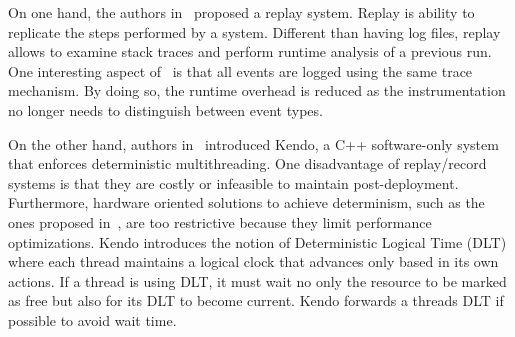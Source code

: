 On one hand, the authors
in~\cite{replayDeterminism} proposed a replay system.
Replay is ability to replicate the steps performed by a system.
Different than having log files, replay allows to examine
stack traces and perform runtime analysis of a previous run.
One interesting aspect of~\cite{replayDeterminism} is that all
events are logged using the same trace mechanism. By doing so,
the runtime overhead is reduced as the instrumentation no longer
needs to distinguish between event types.

On the other hand, authors in~\cite{kendoEfficientDeterministicMultithreading}
introduced Kendo, a C++ software-only system that enforces
deterministic multithreading. One disadvantage
of replay/record systems is that they are costly or infeasible
to maintain post-deployment. Furthermore,
hardware oriented solutions to achieve determinism,
such as the ones proposed in~\cite{hardwareDeterminism},
are too restrictive because they limit performance
optimizations. Kendo introduces the notion of Deterministic
Logical Time (DLT) where each thread maintains a logical
clock that advances only based in its own actions.
If a thread is using DLT, it must wait no only
the resource to be marked as free but also for its
DLT to become current. Kendo forwards a threads DLT
if possible to avoid wait time.